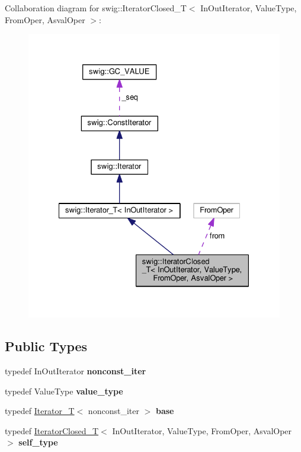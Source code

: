 Collaboration diagram for swig\+:\+:Iterator\+Closed\+\_\+T$<$ In\+Out\+Iterator, Value\+Type, From\+Oper, Asval\+Oper $>$\+:
\nopagebreak
\begin{figure}[H]
\begin{center}
\leavevmode
\includegraphics[width=328pt]{classswig_1_1IteratorClosed__T__coll__graph}
\end{center}
\end{figure}
\subsection*{Public Types}
\begin{DoxyCompactItemize}
\item 
typedef In\+Out\+Iterator {\bfseries nonconst\+\_\+iter}\hypertarget{classswig_1_1IteratorClosed__T_aecf87f1e586e47391110dd0fa07f9ada}{}\label{classswig_1_1IteratorClosed__T_aecf87f1e586e47391110dd0fa07f9ada}

\item 
typedef Value\+Type {\bfseries value\+\_\+type}\hypertarget{classswig_1_1IteratorClosed__T_add6b25c9edba168e95c26d6efc78e6f4}{}\label{classswig_1_1IteratorClosed__T_add6b25c9edba168e95c26d6efc78e6f4}

\item 
typedef \hyperlink{classswig_1_1Iterator__T}{Iterator\+\_\+T}$<$ nonconst\+\_\+iter $>$ {\bfseries base}\hypertarget{classswig_1_1IteratorClosed__T_aba74dd17f3e4af4a8adce10283d66925}{}\label{classswig_1_1IteratorClosed__T_aba74dd17f3e4af4a8adce10283d66925}

\item 
typedef \hyperlink{classswig_1_1IteratorClosed__T}{Iterator\+Closed\+\_\+T}$<$ In\+Out\+Iterator, Value\+Type, From\+Oper, Asval\+Oper $>$ {\bfseries self\+\_\+type}\hypertarget{classswig_1_1IteratorClosed__T_ac05ef4025b065d37ce489e5f12a6bcda}{}\label{classswig_1_1IteratorClosed__T_ac05ef4025b065d37ce489e5f12a6bcda}

\end{DoxyCompactItemize}
